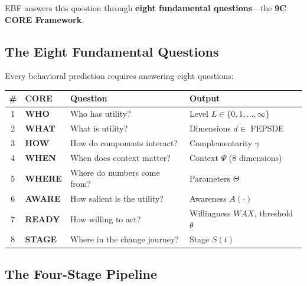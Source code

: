 EBF answers this question through \textbf{eight fundamental questions}---the
\textbf{9C CORE Framework}.

\subsection{The Eight Fundamental Questions}

\begin{definition}
\label{def:8c-core}
Every behavioral prediction requires answering eight questions:

\begin{center}
\renewcommand{\arraystretch}{1.4}
\begin{tabular}{@{}clll@{}}
\toprule
\textbf{\#} & \textbf{CORE} & \textbf{Question} & \textbf{Output} \\
\midrule
1 & \textbf{WHO} & Who has utility? & Level $L \in \{0, 1, ..., \infty\}$ \\
2 & \textbf{WHAT} & What is utility? & Dimensions $d \in$ FEPSDE \\
3 & \textbf{HOW} & How do components interact? & Complementarity $\gamma$ \\
4 & \textbf{WHEN} & When does context matter? & Context $\Psi$ (8 dimensions) \\
5 & \textbf{WHERE} & Where do numbers come from? & Parameters $\Theta$ \\
6 & \textbf{AWARE} & How salient is the utility? & Awareness $A(\cdot)$ \\
7 & \textbf{READY} & How willing to act? & Willingness $WAX$, threshold $\theta$ \\
8 & \textbf{STAGE} & Where in the change journey? & Stage $S(t)$ \\
\bottomrule
\end{tabular}
\end{center}
\end{definition}

\subsection{The Four-Stage Pipeline}
\label{sec:8c-pipeline}

